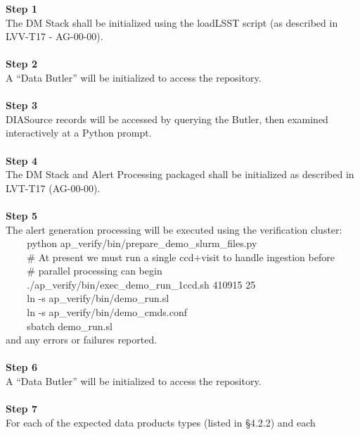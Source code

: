 \textbf{Step 1}\\
The DM Stack shall be initialized using the loadLSST script (as
described in LVV-T17 - AG-00-00).\\
~\\
\textbf{Step 2}\\
A ``Data Butler'' will be initialized to access the repository.\\
~\\
\textbf{Step 3}\\
DIASource records will be accessed by querying the Butler, then examined
interactively at a Python prompt.\\
~\\
\textbf{Step 4}\\
The DM Stack and Alert Processing packaged shall be initialized as
described in LVT-T17 (AG-00-00).\\
~\\
\textbf{Step 5}\\
The alert generation processing will be executed using the verification
cluster:\\
\hspace*{0.333em} ~ ~ ~python
ap\_verify/bin/prepare\_demo\_slurm\_files.py\\
\hspace*{0.333em} ~ ~ ~\# At present we must run a single ccd+visit to
handle ingestion before\\
\hspace*{0.333em} ~ ~ ~\# parallel processing can begin\\
\hspace*{0.333em} ~ ~ ~./ap\_verify/bin/exec\_demo\_run\_1ccd.sh 410915
25\\
\hspace*{0.333em} ~ ~ ~ln -s ap\_verify/bin/demo\_run.sl\\
\hspace*{0.333em} ~ ~ ~ln -s ap\_verify/bin/demo\_cmds.conf\\
\hspace*{0.333em} ~ ~ ~sbatch demo\_run.sl\\
and any errors or failures reported.\\
~\\
\textbf{Step 6}\\
A ``Data Butler'' will be initialized to access the repository.\\
~\\
\textbf{Step 7}\\
For each of the expected data products types (listed in §4.2.2) and each
